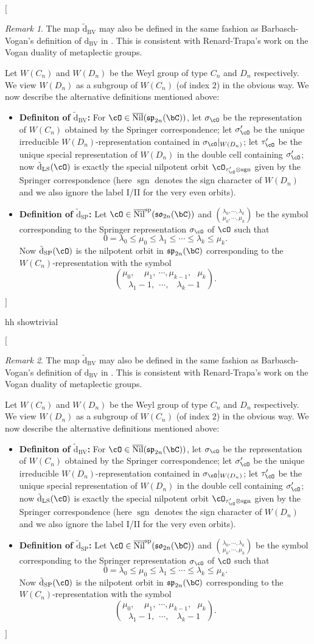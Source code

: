 \documentclass[12pt,a4paper]{amsart}
\newcommand{\trivial}[2][]{\if\relax\detokenize{#1}\relax
{\color{Bittersweet} \vspace{0em} $[$  #2 $]$}
\else
\ifx#1h
\ifcsname showtrivial\endcsname
{\color{orange} \vspace{0em}  $[$ #2 $]$}
\fi
\else {\red Wrong argument!} \fi
\fi
}
\def\fsp{\mathfrak{sp}}
\def\fso{\mathfrak{so}}
\newcommand{\BC}{{\mathbb {C}}}
\newcommand{\sgn}{\operatorname{sgn}}
\newcommand{\oO}{\operatorname{O}}
\newcommand{\g}{\mathfrak g}
\newcommand{\p}{\mathfrak p}
\newcommand{\s}{\mathfrak s}
\renewcommand{\o}{\mathfrak o}
\numberwithin{equation}{section}
\theoremstyle{remark}
\newtheorem*{remark}{Remark}
\def\Nilms{\Nil^{\mathrm{ms}}}
\def\tdBV{\tilde{\mathrm{d}}_{\mathrm{BV}}}
\def\tdLS{\tilde{\mathrm{d}}_{\mathrm{LS}}}
\def\tdSP{\tilde{\mathrm{d}}_{\mathrm{SP}}}
\def\dBV{{\mathrm{d}}_{\mathrm{BV}}}
\begin{document}
\trivial[h]{

\begin{remark}
  The map $\tdBV$ may also be defined in the same fashion as Barbasch-Vogan's definition of $\dBV$
  in \cite[Section~3]{BVUni}. This is consistent with Renard-Trapa's
  work \cite{RT1,RT2} on the Vogan duality of metaplectic groups.

  Let $W(C_n)$ and $W(D_n)$ be the Weyl group of type $C_n$ and $D_n$
  respectively. We view $W(D_n)$ as a subgroup of $W(C_n)$ (of index $2$) in the obvious way.
  We now describe the alternative definitions mentioned above:
  \begin{itemize}
    \item {\bf Definiton of $\tdBV$:}
  For $\cO\in\overline{\mathrm{Nil}}(\fsp_{2n}(\bC))$, let $\sigma_\cO$ be the representation of
  $W(C_n)$ obtained by the Springer correspondence; let $\sigma'_{\cO}$ be the
  unique irreducible $W(D_n)$-representation contained in $\sigma_\cO|_{W(D_n)}$; let $\tau'_{\cO}$ be
  the unique special representation of $W(D_n)$ in the double cell containing
  $\sigma'_\cO$; now $\tdLS(\cO)$ is exactly the special nilpotent orbit
  $\cO_{\tau'_{\cO}\otimes \sgn}$ given by the Springer correspondence (here
  $\sgn$ denotes the sign character of $W(D_n)$ and we also ignore the label I/II for the very even orbits).
\item {\bf Definition of $\tdSP$:}
  Let $\cO \in \overline{\mathrm{Nil}}^{\mathrm{sp}}(\fso_{2n}(\bC))$ and $\binom{\lambda_0, \cdots,
    \lambda_k}{\mu_0, \cdots, \mu_k}$ be the symbol corresponding to the
  Springer representation $\sigma_\cO$ of $\cO$ such that
  \[
    0=\lambda_0\leq \mu_0 \leq \lambda_1\leq \cdots \leq \lambda_k\leq \mu_k.
  \]
  Now $\tdSP(\cO)$ is the nilpotent orbit in $\fsp_{2n}(\bC)$ corresponding to
  the $W(C_n)$-representation with the symbol
  \[
    \binom{\mu_0, \ \ \ \ \  \mu_1, \ \cdots, \mu_{k-1},\ \ \
    \mu_k}{\lambda_1-1,\ \  \cdots, \ \ \ \   \lambda_k-1}.
  \]
\end{itemize}
\end{remark}
}



\end{document}
